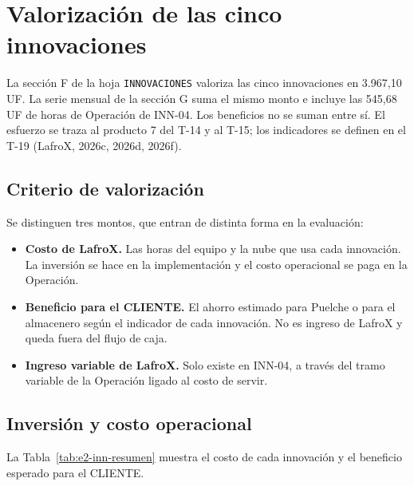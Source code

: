 \section{Valorización de las cinco innovaciones}
\label{sec:e2-innovaciones}

La sección F de la hoja \texttt{INNOVACIONES} valoriza las cinco innovaciones en 3.967,10 UF. La serie mensual de la sección G suma el mismo monto e incluye las 545,68 UF de horas de Operación de INN-04. Los beneficios no se suman entre sí. El esfuerzo se traza al producto 7 del T-14 y al T-15; los indicadores se definen en el T-19 (LafroX, 2026c, 2026d, 2026f).

\subsection{Criterio de valorización}
\label{sec:e2-inn-criterio}

Se distinguen tres montos, que entran de distinta forma en la evaluación:

\begin{itemize}
  \item \textbf{Costo de LafroX.} Las horas del equipo y la nube que usa cada innovación. La inversión se hace en la implementación y el costo operacional se paga en la Operación.
  \item \textbf{Beneficio para el CLIENTE.} El ahorro estimado para Puelche o para el almacenero según el indicador de cada innovación. No es ingreso de LafroX y queda fuera del flujo de caja.
  \item \textbf{Ingreso variable de LafroX.} Solo existe en INN-04, a través del tramo variable de la Operación ligado al costo de servir.
\end{itemize}

\subsection{Inversión y costo operacional}
\label{sec:e2-inn-costos}

La Tabla~\ref{tab:e2-inn-resumen} muestra el costo de cada innovación y el beneficio esperado para el CLIENTE.

